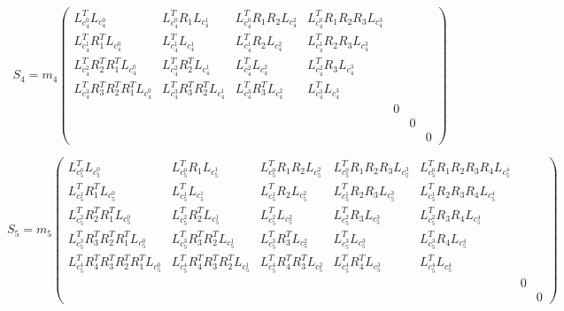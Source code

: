 {\begin{equation*}
    S_4 = m_4
    \begin{pmatrix}
         L_{c_4^0}^T L_{c_4^0} & L_{c_4^0}^T R_1 L_{c_4^1} & L_{c_4^0}^T R_1 R_2 L_{c_4^2} & L_{c_4^0}^T R_1 R_2 R_3 L_{c_4^3} &  &  & \\
         L_{c_4^1}^T R_1^T L_{c_4^0} & L_{c_4^1}^T L_{c_4^1} & L_{c_4^1}^T R_2 L_{c_4^2}  & L_{c_4^1}^T R_2 R_3 L_{c_4^3} &  &  & \\
         L_{c_4^2}^T R_2^T R_1^T L_{c_4^0} & L_{c_4^2}^T R_2^T L_{c_4^1} & L_{c_4^2}^T L_{c_4^2} & L_{c_4^2}^T R_3 L_{c_4^3} &  &  & \\
         L_{c_4^3}^T R_3^T R_2^T R_1^T L_{c_4^0} & L_{c_4^3}^T R_3^T R_2^T L_{c_4^1} & L_{c_4^3}^T R_3^T L_{c_4^2} & L_{c_4^3}^T L_{c_4^3} &  &  & \\
         &  &  &  & 0 &  & \\
         &  &  &  &  & 0 & \\
         &  &  &  &  &  & 0
    \end{pmatrix}
\end{equation*}

\begin{equation*}
    S_5 = m_5
    \begin{pmatrix}
         L_{c_5^0}^T L_{c_5^0} & L_{c_5^0}^T R_1 L_{c_5^1} & L_{c_5^0}^T R_1 R_2 L_{c_5^2} & L_{c_5^0}^T R_1 R_2 R_3 L_{c_5^3} & L_{c_5^0}^T R_1 R_2 R_3 R_4 L_{c_5^4} &  & \\
         L_{c_5^1}^T R_1^T L_{c_5^0} & L_{c_5^1}^T L_{c_5^1} & L_{c_5^1}^T R_2 L_{c_5^2}  & L_{c_5^1}^T R_2 R_3 L_{c_5^3} & L_{c_5^1}^T R_2 R_3 R_4 L_{c_5^4} &  & \\
         L_{c_5^2}^T R_2^T R_1^T L_{c_5^0} & L_{c_5^2}^T R_2^T L_{c_5^1} & L_{c_5^2}^T L_{c_5^2} & L_{c_5^2}^T R_3 L_{c_5^3} & L_{c_5^2}^T R_3 R_4 L_{c_5^4} &  & \\
         L_{c_5^3}^T R_3^T R_2^T R_1^T L_{c_5^0} & L_{c_5^3}^T R_3^T R_2^T L_{c_5^1} & L_{c_5^3}^T R_3^T L_{c_5^2} & L_{c_5^3}^T L_{c_5^3} & L_{c_5^3}^T R_4 L_{c_5^4} &  & \\
         L_{c_5^4}^T R_4^T R_3^T R_2^T R_1^T L_{c_5^0} & L_{c_5^4}^T R_4^T R_3^T R_2^T L_{c_5^1} & L_{c_5^4}^T R_4^T R_3^T L_{c_5^2} & L_{c_5^4}^T R_4^T L_{c_5^3} & L_{c_5^4}^T L_{c_5^4} &  & \\
         &  &  &  &  & 0 & \\
         &  &  &  &  &  & 0
    \end{pmatrix}
\end{equation*}

}

